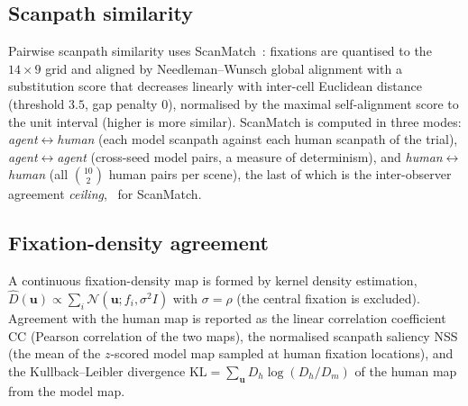 \documentclass[runningheads]{llncs}
\begin{document}
\subsection{Scanpath similarity}\label{sec:m-sim}
Pairwise scanpath similarity uses ScanMatch~\cite{cristino2010scanmatch}: fixations are quantised to the
$14{\times}9$ grid and aligned by Needleman--Wunsch global alignment with a substitution score that
decreases linearly with inter-cell Euclidean distance (threshold $3.5$, gap penalty $0$), normalised by
the maximal self-alignment score to the unit interval (higher is more similar). ScanMatch is computed
in three modes: \emph{agent}$\leftrightarrow$\emph{human} (each model scanpath against each human scanpath
of the trial), \emph{agent}$\leftrightarrow$\emph{agent} (cross-seed model pairs, a measure of
determinism), and \emph{human}$\leftrightarrow$\emph{human} (all $\binom{10}{2}$ human pairs per scene),
the last of which is the inter-observer agreement \emph{ceiling}, \HumanCeiling\ for ScanMatch.
 
\subsection{Fixation-density agreement}\label{sec:m-dens}
A continuous fixation-density map is formed by kernel density estimation,
$\hat D(\mathbf u)\propto\sum_i \mathcal N(\mathbf u;f_i,\sigma^2 I)$ with $\sigma=\rho$ (the central
fixation is excluded). Agreement with the human map is reported as the linear correlation coefficient CC
(Pearson correlation of the two maps), the normalised scanpath saliency NSS (the mean of the $z$-scored
model map sampled at human fixation locations), and the Kullback--Leibler divergence
$\mathrm{KL}=\sum_{\mathbf u} D_h\log(D_h/D_m)$ of the human map from the model map.
 
\end{document}
